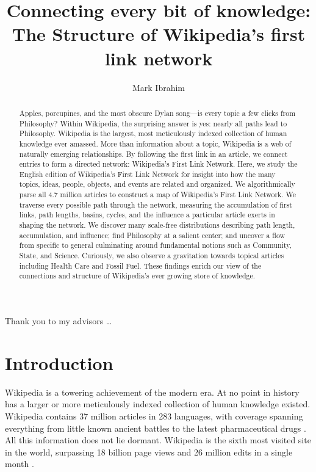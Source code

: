 \documentclass[11pt]{report}
\title{
Connecting every bit of knowledge: \\
The Structure of Wikipedia's first link network
}
\author{Mark Ibrahim}
\begin{document}
\maketitle
\makeacceptance
{}

\begin{abstract}
Apples, porcupines, and the most obscure Dylan song---is every topic a few clicks from Philosophy? 
Within Wikipedia, the surprising answer is yes: nearly all 
paths lead to Philosophy.
Wikipedia is the largest, most meticulously indexed collection of human knowledge ever amassed. 
More than information about a topic, Wikipedia is a web of naturally emerging relationships.  
By following the first link in an article, we connect entries to form a directed network: Wikipedia's First Link Network. 
Here, we study the English edition of Wikipedia's First Link Network for insight into how the many topics, ideas, people, objects, and events
are related and organized.  
We algorithmically parse all 4.7 million articles to construct a map of Wikipedia's First Link Network. 
We traverse every possible path through the network, 
measuring the accumulation of first links, path lengths, basins, cycles, and the influence a particular article exerts in shaping the 
network.
We discover many scale-free distributions describing path length, 
accumulation, and influence; find Philosophy at a salient center; and uncover a flow from specific to general 
culminating around fundamental notions such as Community, State, and Science. 
Curiously, we also observe a gravitation towards topical articles including Health Care and Fossil Fuel.
These findings enrich our view of the connections and structure of
Wikipedia's ever growing store of knowledge.
 
\end{abstract}


\begin{acknowledgements}
    Thank you to my advisors \dots
\end{acknowledgements}



\tableofcontents
\newpage


\listoffigures
\newpage

\doublespacing


\section{Introduction}

Wikipedia is a towering achievement of the modern era. 
At no point in history has a larger or more meticulously indexed collection of human knowledge 
existed.
Wikipedia contains 37 million articles in 283 languages, 
with coverage spanning everything from little known ancient battles to the latest pharmaceutical drugs 
\cite{drugs, stats}.
All this information does not lie dormant. 
Wikipedia is the sixth most visited
site in the world, surpassing 18 billion page views and 26 million edits in a single month
\cite{wiki_edits, wiki_views}.
\end{document}
